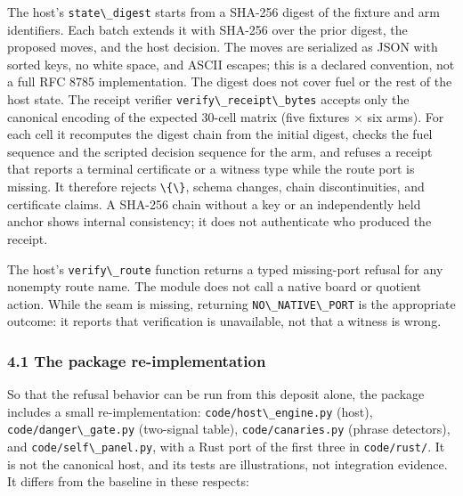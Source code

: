 \documentclass[
  11pt,
]{article}
\newcommand{\passthrough}[1]{#1}
\begin{document}
The host's \passthrough{\lstinline!state\_digest!} starts from a SHA-256
digest of the fixture and arm identifiers. Each batch extends it with
SHA-256 over the prior digest, the proposed moves, and the host
decision. The moves are serialized as JSON with sorted keys, no white
space, and ASCII escapes; this is a declared convention, not a full RFC
8785 implementation. The digest does not cover fuel or the rest of the
host state. The receipt verifier
\passthrough{\lstinline!verify\_receipt\_bytes!} accepts only the
canonical encoding of the expected 30-cell matrix (five fixtures × six
arms). For each cell it recomputes the digest chain from the initial
digest, checks the fuel sequence and the scripted decision sequence for
the arm, and refuses a receipt that reports a terminal certificate or a
witness type while the route port is missing. It therefore rejects
\passthrough{\lstinline!\{\}!}, schema changes, chain discontinuities,
and certificate claims. A SHA-256 chain without a key or an
independently held anchor shows internal consistency; it does not
authenticate who produced the receipt.

The host's \passthrough{\lstinline!verify\_route!} function returns a
typed missing-port refusal for any nonempty route name. The module does
not call a native board or quotient action. While the seam is missing,
returning \passthrough{\lstinline!NO\_NATIVE\_PORT!} is the appropriate
outcome: it reports that verification is unavailable, not that a witness
is wrong.

\subsubsection{4.1 The package
re-implementation}\label{the-package-re-implementation}

So that the refusal behavior can be run from this deposit alone, the
package includes a small re-implementation:
\passthrough{\lstinline!code/host\_engine.py!} (host),
\passthrough{\lstinline!code/danger\_gate.py!} (two-signal table),
\passthrough{\lstinline!code/canaries.py!} (phrase detectors), and
\passthrough{\lstinline!code/self\_panel.py!}, with a Rust port of the
first three in \passthrough{\lstinline!code/rust/!}. It is not the
canonical host, and its tests are illustrations, not integration
evidence. It differs from the baseline in these respects:
\end{document}
